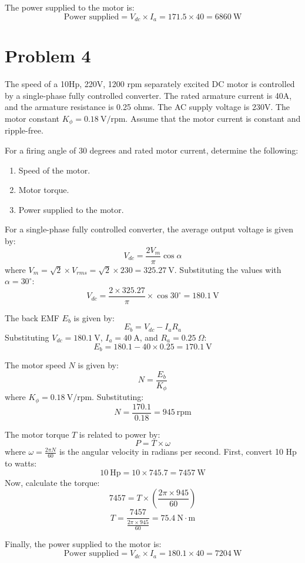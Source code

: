 \documentclass[12pt]{article}
\begin{document}
	\noindent The power supplied to the motor is:
	\[
	\text{Power supplied} = V_{dc} \times I_a = 171.5 \times 40 = 6860\ \text{W}
	\]
	
	
	\section*{Problem 4}
	The speed of a 10Hp, 220V, 1200 rpm separately excited DC motor is controlled by a single-phase fully controlled converter. The rated armature current is 40A, and the armature resistance is 0.25 ohms. The AC supply voltage is 230V. The motor constant $K_\phi = 0.18\ \text{V/rpm}$. Assume that the motor current is constant and ripple-free.
	
	For a firing angle of 30 degrees and rated motor current, determine the following:
	\begin{enumerate}
		\item Speed of the motor.
		\item Motor torque.
		\item Power supplied to the motor.
	\end{enumerate}
	
	\maketitle
	
	\noindent For a single-phase fully controlled converter, the average output voltage is given by:
	\[
	V_{dc} = \frac{2V_m}{\pi} \cos \alpha
	\]
	where \( V_m = \sqrt{2} \times V_{rms} = \sqrt{2} \times 230 = 325.27\ \text{V} \). Substituting the values with \( \alpha = 30^\circ \):
	\[
	V_{dc} = \frac{2 \times 325.27}{\pi} \times \cos 30^\circ = 180.1\ \text{V}
	\]
	
	\noindent The back EMF \( E_b \) is given by:
	\[
	E_b = V_{dc} - I_a R_a
	\]
	Substituting \( V_{dc} = 180.1\ \text{V} \), \( I_a = 40\ \text{A} \), and \( R_a = 0.25\ \Omega \):
	\[
	E_b = 180.1 - 40 \times 0.25 = 170.1\ \text{V}
	\]
	
	\noindent The motor speed \( N \) is given by:
	\[
	N = \frac{E_b}{K_\phi}
	\]
	where \( K_\phi = 0.18\ \text{V/rpm} \). Substituting:
	\[
	N = \frac{170.1}{0.18} = 945\ \text{rpm}
	\]
	
	\noindent The motor torque \( T \) is related to power by:
	\[
	P = T \times \omega
	\]
	where \( \omega = \frac{2\pi N}{60} \) is the angular velocity in radians per second. First, convert 10 Hp to watts:
	\[
	10\ \text{Hp} = 10 \times 745.7 = 7457\ \text{W}
	\]
	Now, calculate the torque:
	\[
	7457 = T \times \left( \frac{2\pi \times 945}{60} \right)
	\]
	\[
	T = \frac{7457}{\frac{2\pi \times 945}{60}} = 75.4\ \text{N}\cdot\text{m}
	\]
	
	\noindent Finally, the power supplied to the motor is:
	\[
	\text{Power supplied} = V_{dc} \times I_a = 180.1 \times 40 = 7204\ \text{W}
	\]
	
\end{document}
